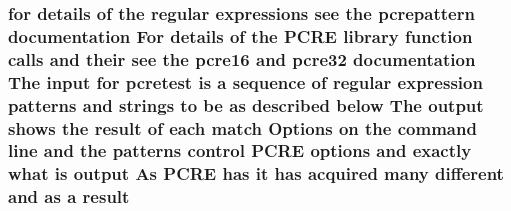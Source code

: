 \subsubsection[{\texorpdfstring{result}{result}}]{\setlength{\rightskip}{0pt plus 5cm}for {\bf details} {\bf of} the regular {\bf expressions} see the {\bf pcrepattern} {\bf documentation} For {\bf details} {\bf of} the {\bf P\+C\+RE} {\bf library} {\bf function} {\bf calls} and their see the {\bf pcre16} and {\bf pcre32} {\bf documentation} The {\bf input} for {\bf pcretest} {\bf is} {\bf a} {\bf sequence} {\bf of} regular {\bf expression} {\bf patterns} and {\bf strings} {\bf to} {\bf be} {\bf as} described {\bf below} The {\bf output} shows the result {\bf of} each {\bf match} Options {\bf on} the {\bf command} {\bf line} and the {\bf patterns} control {\bf P\+C\+RE} {\bf options} and {\bf exactly} {\bf what} {\bf is} {\bf output} As {\bf P\+C\+RE} has {\bf it} has acquired many different and {\bf as} {\bf a} result}\hypertarget{pcretest_8txt_ada864abbb1600264b4da826e87c60355}{}\label{pcretest_8txt_ada864abbb1600264b4da826e87c60355}
